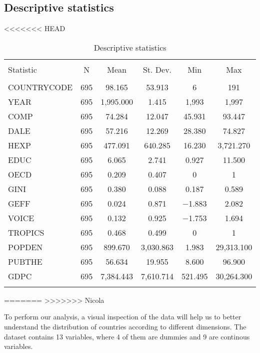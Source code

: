 \documentclass[12pt,a4paper]{article}\usepackage[]{graphicx}\usepackage[]{color}
\begin{document}
\subsection{Descriptive statistics}


<<<<<<< HEAD
\begin{table}[!htbp] \centering 
  \caption{Descriptive statistics} 
  \label{} 
\begin{tabular}{@{\extracolsep{5pt}}lccccc} 
\\[-1.8ex]\hline 
\hline \\[-1.8ex] 
Statistic & \multicolumn{1}{c}{N} & \multicolumn{1}{c}{Mean} & \multicolumn{1}{c}{St. Dev.} & \multicolumn{1}{c}{Min} & \multicolumn{1}{c}{Max} \\ 
\hline \\[-1.8ex] 
COUNTRYCODE & 695 & 98.165 & 53.913 & 6 & 191 \\ 
YEAR & 695 & 1,995.000 & 1.415 & 1,993 & 1,997 \\ 
COMP & 695 & 74.284 & 12.047 & 45.931 & 93.447 \\ 
DALE & 695 & 57.216 & 12.269 & 28.380 & 74.827 \\ 
HEXP & 695 & 477.091 & 640.285 & 16.230 & 3,721.270 \\ 
EDUC & 695 & 6.065 & 2.741 & 0.927 & 11.500 \\ 
OECD & 695 & 0.209 & 0.407 & 0 & 1 \\ 
GINI & 695 & 0.380 & 0.088 & 0.187 & 0.589 \\ 
GEFF & 695 & 0.024 & 0.871 & $-$1.883 & 2.082 \\ 
VOICE & 695 & 0.132 & 0.925 & $-$1.753 & 1.694 \\ 
TROPICS & 695 & 0.468 & 0.499 & 0 & 1 \\ 
POPDEN & 695 & 899.670 & 3,030.863 & 1.983 & 29,313.100 \\ 
PUBTHE & 695 & 56.634 & 19.955 & 8.600 & 96.900 \\ 
GDPC & 695 & 7,384.443 & 7,610.714 & 521.495 & 30,264.300 \\ 
\hline \\[-1.8ex] 
\end{tabular} 
\end{table} 

=======
>>>>>>> Nicola


  To perform our analysis, a visual inspection of the data will help  us to better understand the distribution of countries according to different dimensions. The dataset contains 13 variables, where 4 of them are dummies and 9 are continous variables. 
  
\end{document}

